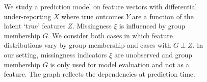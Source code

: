 \documentclass{article}
\begin{document}
\begin{figure}[h]
    \centering
    \caption{
        We study a prediction model on feature vectors with differential under-reporting $X$ where true outcomes $Y$ are a function of the latent `true' features $Z$. Missingness $\xi$ is influenced by group membership $G$. We consider both cases in which feature distributions vary by group membership and cases with $G \perp Z$. In our setting, missingness indicators $\xi$ are unobserved and group membership $G$ is only used for model evaluation and not as a feature. The graph reflects the dependencies at prediction time.
    }
    \label{fig:prediction_model}
\end{figure}
\end{document}
